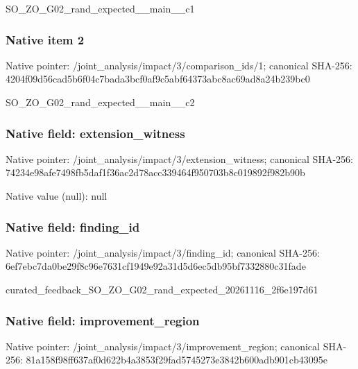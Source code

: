 \documentclass[10pt,a4paper]{article}
\begin{document}
\begingroup\raggedright\sloppy SO\_\allowbreak{}ZO\_\allowbreak{}G02\_\allowbreak{}rand\_\allowbreak{}expected\_\allowbreak{}\_\allowbreak{}main\_\allowbreak{}\_\allowbreak{}c1\par\endgroup

\subsubsection{Native item 2}
Native pointer: /joint\_\allowbreak{}analysis/impact/3/comparison\_\allowbreak{}ids/1; canonical SHA-256: 4204f09d56cad5b6f04c7bada3bcf0af9c5abf64373abc8ac69ad8a24b239bc0

\begingroup\raggedright\sloppy SO\_\allowbreak{}ZO\_\allowbreak{}G02\_\allowbreak{}rand\_\allowbreak{}expected\_\allowbreak{}\_\allowbreak{}main\_\allowbreak{}\_\allowbreak{}c2\par\endgroup

\subsubsection{Native field: extension\_\allowbreak{}witness}
Native pointer: /joint\_\allowbreak{}analysis/impact/3/extension\_\allowbreak{}witness; canonical SHA-256: 74234e98afe7498fb5daf1f36ac2d78acc339464f950703b8c019892f982b90b

Native value (null): null

\subsubsection{Native field: finding\_\allowbreak{}id}
Native pointer: /joint\_\allowbreak{}analysis/impact/3/finding\_\allowbreak{}id; canonical SHA-256: 6ef7ebc7da0be29f8c96e7631cf1949e92a31d5d6ec5db95bf7332880c31fade

\begingroup\raggedright\sloppy curated\_\allowbreak{}feedback\_\allowbreak{}SO\_\allowbreak{}ZO\_\allowbreak{}G02\_\allowbreak{}rand\_\allowbreak{}expected\_\allowbreak{}20261116\_\allowbreak{}2f6e197d61\par\endgroup

\subsubsection{Native field: improvement\_\allowbreak{}region}
Native pointer: /joint\_\allowbreak{}analysis/impact/3/improvement\_\allowbreak{}region; canonical SHA-256: 81a158f98ff637af0d622b4a3853f29fad5745273e3842b600adb901cb43095e
\end{document}
